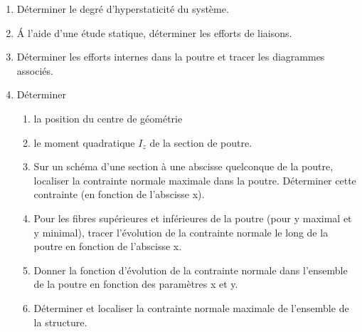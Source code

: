 \documentclass[lecture.tex]{subfiles}
\begin{document}
\medskip

\begin{enumerate}
  \item Déterminer le degré d’hyperstaticité du système.
  \item \'A l’aide d’une étude statique, déterminer les efforts de liaisons.
  \item Déterminer les efforts internes dans la poutre et tracer les diagrammes associés.
  \item Déterminer
  \begin{enumerate}
    \item la position du centre de géométrie
    \item le moment quadratique $I_z$ de la section de poutre.
    \item Sur un schéma d’une section à une abscisse quelconque de la poutre, localiser la contrainte normale maximale dans la poutre. Déterminer cette contrainte (en fonction de l'abscisse x).
    \item Pour les fibres supérieures et inférieures de la poutre (pour y maximal et y minimal), tracer l’évolution de la contrainte normale le long de la poutre en fonction de l’abscisse x.
    \item Donner la fonction d’évolution de la contrainte normale dans l’ensemble de la poutre en fonction des paramètres x et y.
    \item Déterminer et localiser la contrainte normale maximale de l’ensemble de la structure.
  \end{enumerate}

\end{enumerate}

\finexercice
\end{document}
